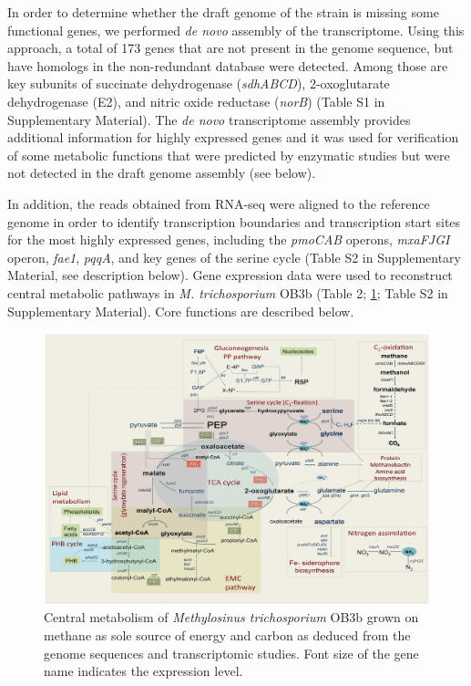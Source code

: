 In order to determine whether the draft genome of the strain is missing some functional genes, we performed \textit{de novo} assembly of the transcriptome.
Using this approach, a total of 173 genes that are not present in the genome sequence, but have homologs in the non-redundant database were detected.
Among those are key subunits of succinate dehydrogenase (\textit{sdhABCD}), 2-oxoglutarate dehydrogenase (E2), and nitric oxide reductase (\textit{norB}) (Table S1 in Supplementary Material).
The \textit{de novo} transcriptome assembly provides additional information for highly expressed genes and it was used for verification of some metabolic functions that were predicted by enzymatic studies but were not detected in the draft genome assembly (see below).

In addition, the reads obtained from RNA-seq were aligned to the reference genome in order to identify transcription boundaries and transcription start sites for the most highly expressed genes, including the \textit{pmoCAB} operons, \textit{mxaFJGI} operon, \textit{fae1}, \textit{pqqA}, and key genes of the serine cycle (Table S2 in Supplementary Material, see description below).
Gene expression data were used to reconstruct central metabolic pathways in \textit{M. trichosporium} OB3b (Table 2; \ref{fig:A_metabolic_map}; Table S2 in Supplementary Material).
Core functions are described below.


\begin{figure}[H]
\centering
     \includegraphics[width=1.0\textwidth]{./tex/chapter1/figures/figure1.png}
     \begin{singlespace}
     \caption[Central metabolism of \textit{Methylosinus trichosporium} OB3b]{
        Central metabolism of \textit{Methylosinus trichosporium} OB3b grown on methane as sole source of energy and carbon as
        deduced from the genome sequences and transcriptomic studies.
        Font size of the gene name indicates the expression level.}
     \label{fig:A_metabolic_map}
     \end{singlespace}
\end{figure}


